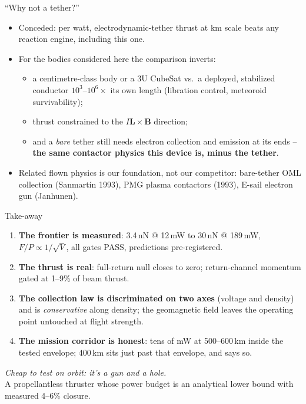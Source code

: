 \documentclass[10pt,aspectratio=169]{beamer}
\begin{document}
\begin{frame}{``Why not a tether?''}
  \begin{itemize}\small
    \item Conceded: per watt, electrodynamic-tether thrust at km scale beats
          any reaction engine, including this one.
    \item For the bodies considered here the comparison inverts:
    \begin{itemize}\small
      \item a centimetre-class body or a 3U CubeSat vs.\ a deployed,
            stabilized conductor $10^3$--$10^6\times$ its own length
            (libration control, meteoroid survivability);
      \item thrust constrained to the $I\mathbf{L}\times\mathbf{B}$
            direction;
      \item and a \emph{bare} tether still needs electron collection and
            emission at its ends -- \textbf{the same contactor physics this
            device is, minus the tether}.
    \end{itemize}
    \item Related flown physics is our foundation, not our competitor:
          bare-tether OML collection (Sanmart\'in 1993), PMG plasma
          contactors (1993), E-sail electron gun (Janhunen).
  \end{itemize}
\end{frame}

\begin{frame}{Take-away}
  \begin{enumerate}
    \item \textbf{The frontier is measured}: 3.4\,nN @ 12\,mW to 30\,nN @
          189\,mW, $F/P \propto 1/\sqrt{V}$, all gates PASS, predictions
          pre-registered.
    \item \textbf{The thrust is real}: full-return null closes to zero;
          return-channel momentum gated at 1--9\% of beam thrust.
    \item \textbf{The collection law is discriminated on two axes}
          (voltage and density) and is \emph{conservative} along density;
          the geomagnetic field leaves the operating point untouched at
          flight strength.
    \item \textbf{The mission corridor is honest}: tens of mW at
          500--600\,km inside the tested envelope; 400\,km sits just past
          that envelope, and says so.
  \end{enumerate}
  \vspace{2ex}
  \centering
  \large\emph{Cheap to test on orbit: it's a gun and a hole.}\\[1ex]
  \normalsize A propellantless thruster whose power budget is an analytical
  lower bound with measured 4--6\% closure.
\end{frame}
\end{document}
